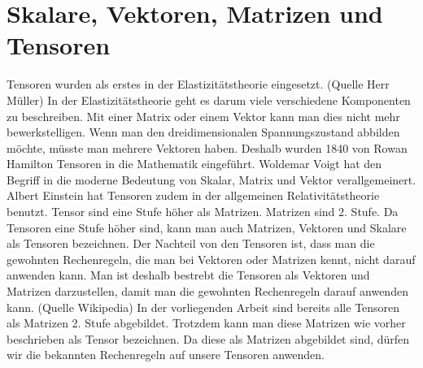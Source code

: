 \section{Skalare, Vektoren, Matrizen und Tensoren\label{spannung:section:Skalare,_Vektoren,_Matrizen_und_Tensoren}}
Tensoren wurden als erstes in der Elastizitätstheorie eingesetzt. (Quelle Herr Müller)
In der Elastizitätstheorie geht es darum viele verschiedene Komponenten zu beschreiben.
Mit einer Matrix oder einem Vektor kann man dies nicht mehr bewerkstelligen.
Wenn man den dreidimensionalen Spannungszustand abbilden möchte, müsste man mehrere Vektoren haben.
Deshalb wurden 1840 von Rowan Hamilton Tensoren in die Mathematik eingeführt.
Woldemar Voigt hat den Begriff in die moderne Bedeutung von Skalar, Matrix und Vektor verallgemeinert.
Albert Einstein hat Tensoren zudem in der allgemeinen Relativitätstheorie benutzt.
Tensor sind eine Stufe höher als Matrizen. Matrizen sind 2. Stufe.
Da Tensoren eine Stufe höher sind, kann man auch Matrizen, Vektoren und Skalare als Tensoren bezeichnen.
Der Nachteil von den Tensoren ist, dass man die gewohnten Rechenregeln, die man bei Vektoren oder Matrizen kennt,
nicht darauf anwenden kann. Man ist deshalb bestrebt die Tensoren als Vektoren und Matrizen darzustellen,
damit man die gewohnten Rechenregeln darauf anwenden kann. (Quelle Wikipedia)
In der vorliegenden Arbeit sind bereits alle Tensoren als Matrizen 2. Stufe abgebildet.
Trotzdem kann man diese Matrizen wie vorher beschrieben als Tensor bezeichnen.
Da diese als Matrizen abgebildet sind, dürfen wir die bekannten Rechenregeln auf unsere Tensoren anwenden.